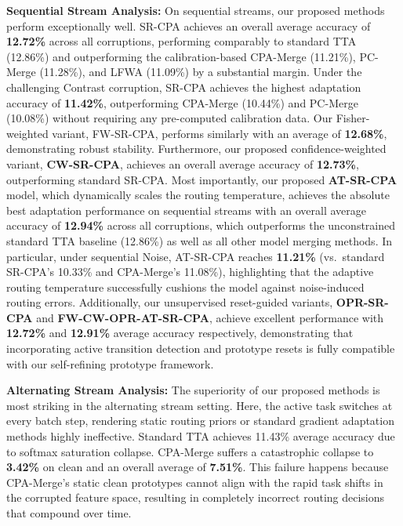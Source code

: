 \documentclass{article}
\theoremstyle{plain}
\theoremstyle{definition}
\theoremstyle{remark}
\begin{document}
\textbf{Sequential Stream Analysis:} On sequential streams, our proposed methods perform exceptionally well. SR-CPA achieves an overall average accuracy of \textbf{12.72\%} across all corruptions, performing comparably to standard TTA (12.86\%) and outperforming the calibration-based CPA-Merge (11.21\%), PC-Merge (11.28\%), and LFWA (11.09\%) by a substantial margin. Under the challenging Contrast corruption, SR-CPA achieves the highest adaptation accuracy of \textbf{11.42\%}, outperforming CPA-Merge (10.44\%) and PC-Merge (10.08\%) without requiring any pre-computed calibration data. Our Fisher-weighted variant, FW-SR-CPA, performs similarly with an average of \textbf{12.68\%}, demonstrating robust stability. Furthermore, our proposed confidence-weighted variant, \textbf{CW-SR-CPA}, achieves an overall average accuracy of \textbf{12.73\%}, outperforming standard SR-CPA. Most importantly, our proposed \textbf{AT-SR-CPA} model, which dynamically scales the routing temperature, achieves the absolute best adaptation performance on sequential streams with an overall average accuracy of \textbf{12.94\%} across all corruptions, which outperforms the unconstrained standard TTA baseline (12.86\%) as well as all other model merging methods. In particular, under sequential Noise, AT-SR-CPA reaches \textbf{11.21\%} (vs.\ standard SR-CPA's 10.33\% and CPA-Merge's 11.08\%), highlighting that the adaptive routing temperature successfully cushions the model against noise-induced routing errors. Additionally, our unsupervised reset-guided variants, \textbf{OPR-SR-CPA} and \textbf{FW-CW-OPR-AT-SR-CPA}, achieve excellent performance with \textbf{12.72\%} and \textbf{12.91\%} average accuracy respectively, demonstrating that incorporating active transition detection and prototype resets is fully compatible with our self-refining prototype framework.

\textbf{Alternating Stream Analysis:} The superiority of our proposed methods is most striking in the alternating stream setting. Here, the active task switches at every batch step, rendering static routing priors or standard gradient adaptation methods highly ineffective. Standard TTA achieves 11.43\% average accuracy due to softmax saturation collapse. CPA-Merge suffers a catastrophic collapse to \textbf{3.42\%} on clean and an overall average of \textbf{7.51\%}. This failure happens because CPA-Merge's static clean prototypes cannot align with the rapid task shifts in the corrupted feature space, resulting in completely incorrect routing decisions that compound over time. 
\end{document}

